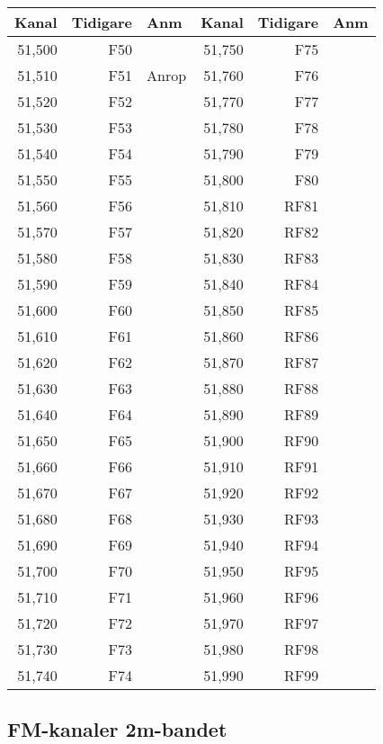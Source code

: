\begin{longtable}{rrl|rrl}
	 Kanal & Tidigare & Anm   &  Kanal & Tidigare & Anm \\ \hline
	51,500 &     F50 &       & 51,750 &     F75 &  \\
	51,510 &     F51 & Anrop & 51,760 &     F76 &  \\
	51,520 &     F52 &       & 51,770 &     F77 &  \\
	51,530 &     F53 &       & 51,780 &     F78 &  \\
	51,540 &     F54 &       & 51,790 &     F79 &  \\
	51,550 &     F55 &       & 51,800 &     F80 &  \\
	51,560 &     F56 &       & 51,810 &    RF81 &  \\
	51,570 &     F57 &       & 51,820 &    RF82 &  \\
	51,580 &     F58 &       & 51,830 &    RF83 &  \\
	51,590 &     F59 &       & 51,840 &    RF84 &  \\
	51,600 &     F60 &       & 51,850 &    RF85 &  \\
	51,610 &     F61 &       & 51,860 &    RF86 &  \\
	51,620 &     F62 &       & 51,870 &    RF87 &  \\
	51,630 &     F63 &       & 51,880 &    RF88 &  \\
	51,640 &     F64 &       & 51,890 &    RF89 &  \\
	51,650 &     F65 &       & 51,900 &    RF90 &  \\
	51,660 &     F66 &       & 51,910 &    RF91 &  \\
	51,670 &     F67 &       & 51,920 &    RF92 &  \\
	51,680 &     F68 &       & 51,930 &    RF93 &  \\
	51,690 &     F69 &       & 51,940 &    RF94 &  \\
	51,700 &     F70 &       & 51,950 &    RF95 &  \\
	51,710 &     F71 &       & 51,960 &    RF96 &  \\
	51,720 &     F72 &       & 51,970 &    RF97 &  \\
	51,730 &     F73 &       & 51,980 &    RF98 &  \\
	51,740 &     F74 &       & 51,990 &    RF99 &
\end{longtable}

\clearpage
\subsection{FM-kanaler 2m-bandet}

